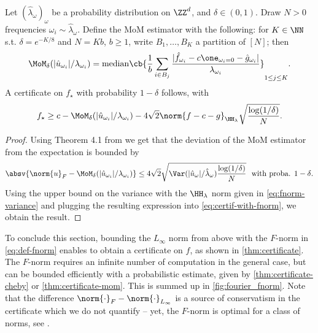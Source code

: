 \documentclass{article}
\begin{document}
\begin{theorem}\label{thm:certificate-mom}
  Let $(\hat{\lambda}_\omega)_{\omega}$ be a probability distribution on $\ZZ^d$, and $\delta \in (0,1)$. Draw $N > 0$ frequencies $\omega_i \sim \hat{\lambda}_\omega$. Define the MoM estimator with the following: for $K \in \NN$ s.t. $\delta = e^{-K/8}$ and $N = Kb$, $b \geq 1$, write $B_1, \dots, B_K$ a partition of $[N]$; then
  \begin{equation}
    \MoM_\delta(|\hat{u}_{\omega_i}| / \lambda_{\omega_i}) = \mathrm{median} \cb{\frac{1}{b} \sum_{i \in B_j} \frac{|\hat{f}_{\omega_i} - c \one_{\omega_i = 0} - \hat{g}_{\omega_i}|}{\lambda_{\omega_i}}}_{1 \leq j \leq K}.
  \end{equation}
  A certificate on $f_\star$ with probability $1-\delta$ follows, with
  \begin{equation}
    f_\star \geq c - \MoM_\delta(|\hat{u}_{\omega_i}| / \lambda_{\omega_i}) - 4\sqrt{2} \norm{f - c - g}_{\HH_\lambda} \sqrt{\frac{\log(1/\delta)}{N}}.
  \end{equation}
\end{theorem}
\begin{proof}
  Using \eg Theorem 4.1 from \cite{devroyeSubGaussianMeanEstimators2016} we get that the deviation of the MoM estimator from the expectation is bounded by
  \begin{equation}\label{eq:proof-mom-1}
    \absv{
      \norm{u}_F - \MoM_\delta(|\hat{u}_{\omega_i}| / \lambda_{\omega_i})
    } \leq 4\sqrt{2} \sqrt{\Var(|\hat{u}_\omega|/\hat{\lambda}_\omega) \frac{\log(1/\delta)}{N}}
    ~~ \text{with proba. $1 - \delta$.}
  \end{equation}
  Using the upper bound on the variance with the $\HH_\lambda$ norm given in \cref{eq:fnorm-variance} and plugging the resulting expression into \cref{eq:certif-with-fnorm}, we obtain the result.
\end{proof}

To conclude this section, bounding the $L_\infty$ norm from above with the $F$-norm in \cref{eq:def-fnorm} enables to obtain a certificate on $f$, as shown in \cref{thm:certificate}. The $F$-norm requires an infinite number of computation in the general case, but can be bounded efficiently with a probabilistic estimate, given by \cref{thm:certificate-cheby} or \cref{thm:certificate-mom}. This is summed up in \cref{fig:fourier_fnorm}. Note that the difference $\norm{\cdot}_{F} - \norm{\cdot}_{L_\infty}$ is a source of conservatism in the certificate which we do not quantify -- yet, the $F$-norm is optimal for a class of norms, see \cite[Lemma 3]{woodworthNonConvexOptimizationCertificates2022}.
\end{document}
